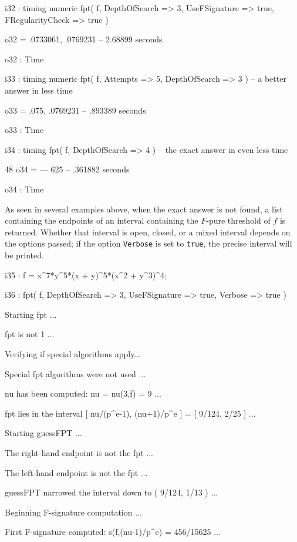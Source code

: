 \documentclass{amsart}
\begin{document}
{{\begin{MyVerbatim}
i32 : timing numeric fpt( f, DepthOfSearch => 3, UseFSignature => true, FRegularityCheck => true )

o32 = {.0733061, .0769231}
      -- 2.68899 seconds

o32 : Time

i33 : timing numeric fpt( f, Attempts => 5, DepthOfSearch => 3 ) -- a better answer in less time

o33 = {.075, .0769231}
      -- .893389 seconds

o33 : Time

i34 : timing fpt( f, DepthOfSearch => 4 ) -- the exact answer in even less time

       48
o34 = ---
      625
      -- .361882 seconds

o34 : Time

\end{MyVerbatim}
}            
            
As seen in several examples above, when the exact answer is not found, a list containing the endpoints of an interval containing the $F$-pure threshold of $f$ is returned.  Whether that interval is open, closed, or a mixed interval depends on the options passed; if the option {\tt Verbose} is set to {\tt true}, the precise interval will be printed.

{\small
{}
\begin{MyVerbatim}

i35 : f = x^7*y^5*(x + y)^5*(x^2 + y^3)^4;

i36 :  fpt( f, DepthOfSearch => 3, UseFSignature => true, Verbose => true )

Starting fpt ...

fpt is not 1 ...

Verifying if special algorithms apply...

Special fpt algorithms were not used ...

nu has been computed: nu = nu(3,f) = 9 ...

fpt lies in the interval [ nu/(p^e-1), (nu+1)/p^e ] = [ 9/124, 2/25 ] ...

Starting guessFPT ...

The right-hand endpoint is not the fpt ...

The left-hand endpoint is not the fpt ...

guessFPT narrowed the interval down to ( 9/124, 1/13 ) ...

Beginning F-signature computation ...

First F-signature computed: s(f,(nu-1)/p^e) = 456/15625 ...


\end{MyVerbatim}}}
\end{document}

